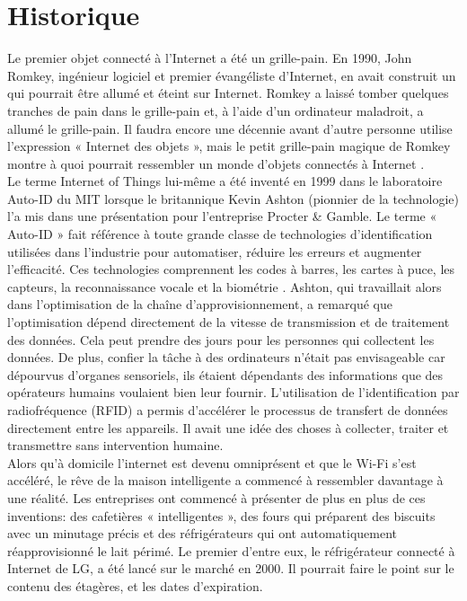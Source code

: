 	\section{Historique}
	Le premier \og objet \fg{}  connecté à l’Internet a été un grille-pain. En 1990, John Romkey, ingénieur logiciel et premier évangéliste d'Internet, en avait construit un qui pourrait être allumé et éteint sur Internet. Romkey a laissé tomber quelques tranches de pain dans le grille-pain et, à l'aide d'un ordinateur maladroit, a allumé le grille-pain. Il faudra encore une décennie avant d'autre personne utilise l'expression « Internet des objets », mais le petit grille-pain magique de Romkey montre à quoi pourrait ressembler un monde d'objets connectés à Internet \cite{pardes2020iot}.\\
	 Le terme \og Internet of Things \fg{} lui-même a été inventé en 1999 dans le laboratoire Auto-ID du MIT lorsque le britannique Kevin Ashton (pionnier de la technologie) l'a mis dans une présentation pour l’entreprise Procter \& Gamble. Le terme « Auto-ID » fait référence à toute grande classe de technologies d'identif{\kern0pt}ication utilisées dans l'industrie pour automatiser, réduire les erreurs et augmenter l'ef{\kern0pt}f{\kern0pt}icacité. Ces technologies comprennent les codes à barres, les cartes à puce, les capteurs, la reconnaissance vocale et la biométrie \cite{sundmaeker2010vision}. Ashton, qui travaillait alors dans l'optimisation de la chaîne d'approvisionnement, a remarqué que l'optimisation dépend directement de la vitesse de transmission et de traitement des données. Cela peut prendre des jours pour les personnes qui collectent les données. De plus, conf{\kern0pt}ier la tâche à des ordinateurs n’était pas envisageable car dépourvus d’organes sensoriels, ils étaient dépendants des informations que des opérateurs humains voulaient bien leur fournir. L'utilisation de l'identif{\kern0pt}ication par radiofréquence (RFID) a permis d'accélérer le processus de transfert de données directement entre les appareils. Il avait une idée des choses à collecter, traiter et transmettre sans intervention humaine.\\

	Alors qu’à domicile l'internet est devenu omniprésent et que le Wi-Fi s'est accéléré, le rêve de la maison intelligente a commencé à ressembler davantage à une réalité. Les entreprises ont commencé à présenter de plus en plus de ces inventions: des cafetières « intelligentes », des fours qui préparent des biscuits avec un minutage précis et des réfrigérateurs qui ont automatiquement réapprovisionné le lait périmé. Le premier d'entre eux, le réfrigérateur connecté à Internet de LG, a été lancé sur le marché en 2000. Il pourrait faire le point sur le contenu des étagères, et les dates d'expiration.


